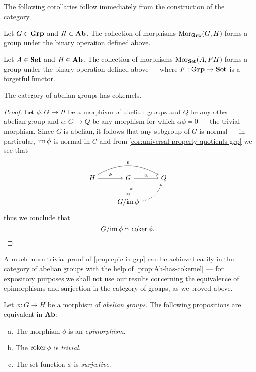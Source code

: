 The following corollaries follow immediately from the construction of the
category.

\begin{corollary}
Let \(G \in {\textbf{Grp}}\) and \(H \in {\textbf{Ab}}\). The collection of morphisms
\(\operatorname{Mor}_{\textbf{Grp}}(G, H)\) forms a group under the binary operation defined above.
\end{corollary}

\begin{corollary}
Let \(A \in {\textbf{Set}}\) and \(H \in {\textbf{Ab}}\). The collection of morphisms
\(\operatorname{Mor}_{\textbf{Set}}(A, FH)\) forms a group under the binary operation defined above
--- where \(F: {\textbf{Grp}} \to {\textbf{Set}}\) is a forgetful functor.
\end{corollary}

\begin{proposition}[Cokernel in \(\Ab\)]
\label{prop:Ab-has-cokernel}
The category of abelian groups has cokernels.
\end{proposition}

\begin{proof}
Let \(\phi: G \to H\) be a morphism of abelian groups and \(Q\) be any other
abelian group and \(\alpha: G \to Q\) be any morphism for which
\(\alpha \phi = 0\) --- the trivial morphism. Since \(G\) is abelian, it follows
that any subgroup of \(G\) is normal --- in particular, \(\operatorname{im} \phi\) is normal
in \(G\) and from \cref{cor:universal-property-quotients-grp} we see that
\[
\begin{tikzcd}
H \ar[r, "\phi"] \ar[rr, bend left, "0"]
&G \ar[r, "\alpha"] \ar[d, two heads, "\pi"]
&Q \\
&G/{\im \phi} \ar[ru, bend right, dashed]
\end{tikzcd}
\]
thus we conclude that
\[
G/{\operatorname{im} \phi} \simeq \operatorname{coker} \phi.
\]
\end{proof}

A much more trivial proof of \cref{prop:epic-in-grp} can be achieved easily in
the category of abelian groups with the help of \cref{prop:Ab-has-cokernel} ---
for expository purposes we shall not use our results concerning the equivalence
of epimorphisms and surjection in the category of groups, as we proved above.

\begin{proposition}
\label{prop:epic-in-Ab}
Let \(\phi: G \to H\) be a morphism of \emph{abelian groups}. The following
propositions are equivalent in \(\Ab\):
\begin{enumerate}[(a)]\setlength\itemsep{0em}
\item The morphism \(\phi\) is an \emph{epimorphism}.

\item The \(\operatorname{coker} \phi\) is \emph{trivial}.

\item The set-function \(\phi\) is \emph{surjective}.
\end{enumerate}
\end{proposition}

